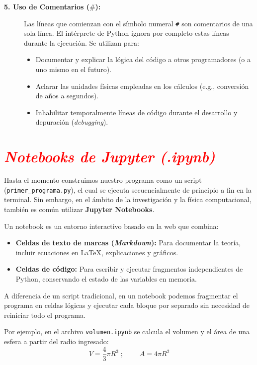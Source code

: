 \documentclass[12pt]{article}
\begin{document}
\begin{description}
    \item[\textbf{5. Uso de Comentarios ($\mathtt{\#}$):}] 
    Las líneas que comienzan con el símbolo numeral \lstinline|#| son comentarios de una sola línea. El intérprete de Python ignora por completo estas líneas durante la ejecución. Se utilizan para:
    \begin{itemize}
        \item Documentar y explicar la lógica del código a otros programadores (o a uno mismo en el futuro).
        \item Aclarar las unidades físicas empleadas en los cálculos (e.g., conversión de años a segundos).
        \item Inhabilitar temporalmente líneas de código durante el desarrollo y depuración (\textit{debugging}).
    \end{itemize}
\end{description}


\section*{\textcolor{red}{\textit{Notebooks de Jupyter (.ipynb)}}}

Hasta el momento construimos nuestro programa como un script (\lstinline|primer_programa.py|), 
el cual se ejecuta secuencialmente de principio a fin en la terminal. 
Sin embargo, en el ámbito de la investigación y la física computacional, también es común 
utilizar \textbf{Jupyter Notebooks}.

Un notebook es un entorno interactivo basado en la web que combina:
\begin{itemize}
    \item \textbf{Celdas de texto de marcas (\textit{Markdown}):} Para documentar la teoría, 
    incluir ecuaciones en \LaTeX{}, explicaciones y gráficos.
    \item \textbf{Celdas de código:} Para escribir y ejecutar fragmentos independientes de Python, 
    conservando el estado de las variables en memoria.
\end{itemize}

A diferencia de un script tradicional, en un notebook podemos fragmentar el programa en celdas lógicas
y ejecutar cada bloque por separado sin necesidad de reiniciar todo el programa.

Por ejemplo, en el archivo \lstinline|volumen.ipynb| se calcula el volumen y el área de una esfera 
a partir del radio 
ingresado:
\begin{equation*}
    V = \frac{4}{3}\pi R^3\;;\;\qquad A = 4\pi R^2
\end{equation*}
\end{document}
